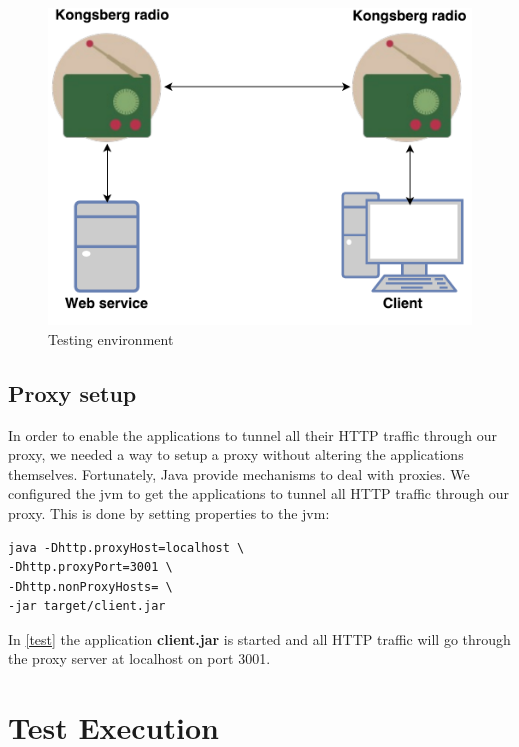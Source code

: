 \begin{figure}[h]
\centering
\includegraphics[scale=0.6]{images/radio_testing_environment.pdf}
\caption{Testing environment}
\label{figure-radio-testing-environment}
\end{figure}

\subsection{Proxy setup}

In order to enable the applications to tunnel all their HTTP traffic through our
proxy, we needed a way to setup a proxy without altering the applications
themselves. Fortunately, Java provide mechanisms to deal with
proxies\cite{oracle-proxy}. We configured the \gls{jvm} to get the applications
to tunnel all HTTP traffic through our proxy. This is done by setting properties
to the \gls{jvm}:


\begin{lstlisting}[frame=single, caption="Setting a proxy on the \gls{jvm}", label=test]
java -Dhttp.proxyHost=localhost \
-Dhttp.proxyPort=3001 \
-Dhttp.nonProxyHosts= \
-jar target/client.jar
\end{lstlisting}

In \cref{test} the application \textbf{client.jar} is started and all HTTP
traffic will go through the proxy server at localhost on port 3001.

\section{Test Execution}

